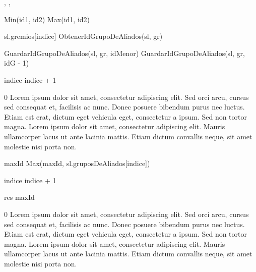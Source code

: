 {, , }{}
{
	\state {} \asig Min(id1, id2)						
	\state {} \asig Max(id1, id2)						
	\state

	\state {} 										

									
		\state

		\state {} \asig sl.gremios[indice]			
		\state {} \asig ObtenerIdGrupoDeAliados(sl, gr)		
		\state

														
			\state GuardarIdGrupoDeAliados(sl, gr, idMenor)					
		\Else {}										
				\state GuardarIdGrupoDeAliados(sl, gr, idG - 1)				
			\endif
		\endif
		\state

		\state indice \asig indice + 1			
	\endwhile
}
{0}
{Lorem ipsum dolor sit amet, consectetur adipiscing elit. Sed orci arcu, cursus sed consequat et, facilisis ac nunc. Donec posuere bibendum purus nec luctus. Etiam est erat, dictum eget vehicula eget, consectetur a ipsum. Sed non tortor magna. Lorem ipsum dolor sit amet, consectetur adipiscing elit. Mauris ullamcorper lacus ut ante lacinia mattis. Etiam dictum convallis neque, sit amet molestie nisi porta non.}

{
	\state {} 									

	\state
	\state {} 								
					
		\state
		
		\state maxId \asig Max(maxId, sl.gruposDeAliados[indice])	

		\state
		\state indice \asig indice + 1								
	\endwhile
	\state

	\state res \asig maxId											
}
{0}
{Lorem ipsum dolor sit amet, consectetur adipiscing elit. Sed orci arcu, cursus sed consequat et, facilisis ac nunc. Donec posuere bibendum purus nec luctus. Etiam est erat, dictum eget vehicula eget, consectetur a ipsum. Sed non tortor magna. Lorem ipsum dolor sit amet, consectetur adipiscing elit. Mauris ullamcorper lacus ut ante lacinia mattis. Etiam dictum convallis neque, sit amet molestie nisi porta non.}

